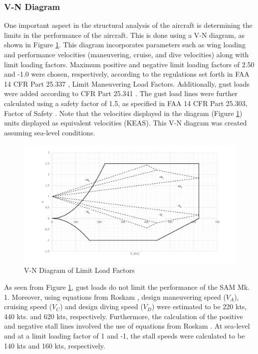 \subsubsection{V-N Diagram}
\label{subvn}
One important aspect in the structural analysis of the aircraft is determining the limits in the performance of the aircraft. This is done using a V-N diagram, as shown in Figure \ref{figVN}. This diagram incorporates parameters such as wing loading and performance velocities (maneuvering, cruise, and dive velocities) along with limit loading factors. Maximum positive and negative limit loading factors of 2.50 and -1.0 were chosen, respectively, according to the regulations set forth in FAA 14 CFR Part 25.337 \cite{cfr}, Limit Maneuvering Load Factors. Additionally, gust loads were added according to CFR Part 25.341 \cite{cfr}. The gust load lines were further calculated using a safety factor of 1.5, as specified in FAA 14 CFR Part 25.303, Factor of Safety \cite{cfr}. Note that the velocities displayed in the diagram (Figure \ref{figVN}) units displayed as equivalent velocities (KEAS). This V-N diagram was created assuming sea-level conditions. 

\begin{figure}[H]
    \centering
    \includegraphics[width=\linewidth]{Photos/VN_Diagram.pdf}
    \caption{V-N Diagram of Limit Load Factors}
    \label{figVN}
\end{figure}

As seen from Figure \ref{figVN}, gust loads do not limit the performance of the SAM Mk. 1. Moreover, using equations from Roskam \cite{roskam_5}, design maneuvering speed ($V_{A}$), cruising speed ($V_{C}$) and design diving speed ($V_{D}$) were estimated to be 220 kts, 440 kts. and 620 kts, respectively. Furthermore, the calculation of the positive and negative stall lines involved the use of equations from Roskam \cite{roskam_5}. At sea-level and at a limit loading factor of 1 and -1, the stall speeds were calculated to be 140 kts and 160 kts, respectively.

